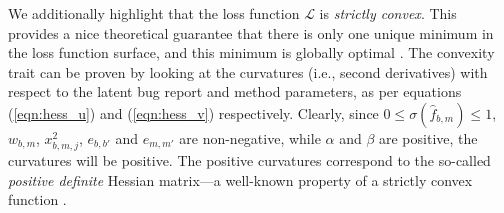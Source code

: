 We additionally highlight that the loss function $\mathcal{L}$ is \emph{strictly convex}. This provides a nice theoretical guarantee that there is only one unique minimum in the loss function surface, and this minimum is globally optimal \cite{Renegar:2001:MVI:502968}. The convexity trait can be proven by looking at the curvatures (i.e., second derivatives) with respect to the latent bug report and method parameters, as per equations (\ref{eqn:hess_u}) and (\ref{eqn:hess_v}) respectively. Clearly, since $0 \leq \sigma(\hat{f}_{b,m}) \leq 1$, $w_{b,m}$, $x_{b,m,j}^2$, $e_{b,b'}$ and $e_{m,m'}$ are non-negative, while $\alpha$ and $\beta$ are positive, the curvatures will be positive. The positive curvatures correspond to the so-called \emph{positive definite} Hessian matrix---a well-known property of a strictly convex function \cite{Renegar:2001:MVI:502968}.






